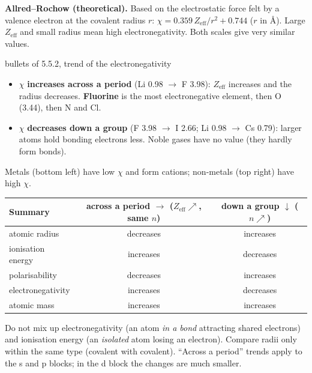 \textbf{Allred--Rochow (theoretical).} Based on the electrostatic force felt by a valence electron at
the covalent radius $r$: $\chi = 0.359\,Z_\mathrm{eff}/r^2 + 0.744$ ($r$ in \AA). Large $Z_\mathrm{eff}$
and small radius mean high electronegativity. Both scales give very similar values.
\begin{handout}{bullets of 5.5.2, trend of the electronegativity}
\begin{itemize}
  \item $\chi$ \textbf{increases across a period} (Li 0.98 $\to$ F 3.98): $Z_\mathrm{eff}$ increases
        and the radius decreases. \textbf{Fluorine} is the most electronegative element, then O (3.44),
        then N and Cl.
  \item $\chi$ \textbf{decreases down a group} (F 3.98 $\to$ I 2.66; Li 0.98 $\to$ Cs 0.79): larger
        atoms hold bonding electrons less. Noble gases have no value (they hardly form bonds).
\end{itemize}
Metals (bottom left) have low $\chi$ and form cations; non-metals (top right) have high $\chi$.
\end{handout}

\begin{center}\small
\begin{tabular}{@{}l c c@{}}
\toprule
\textbf{Summary} & across a period $\rightarrow$ ($Z_\mathrm{eff}\nearrow$, same $n$) &
down a group $\downarrow$ ($n\nearrow$)\\ \midrule
atomic radius & decreases & increases\\
ionisation energy & increases & decreases\\
polarisability & decreases & increases\\
electronegativity & increases & decreases\\
atomic mass & increases & increases\\ \bottomrule
\end{tabular}
\end{center}
\begin{trap}
Do not mix up electronegativity (an atom \emph{in a bond} attracting shared electrons) and ionisation
energy (an \emph{isolated} atom losing an electron). Compare radii only within the same type
(covalent with covalent). ``Across a period'' trends apply to the s and p blocks; in the d block the
changes are much smaller.
\end{trap}

